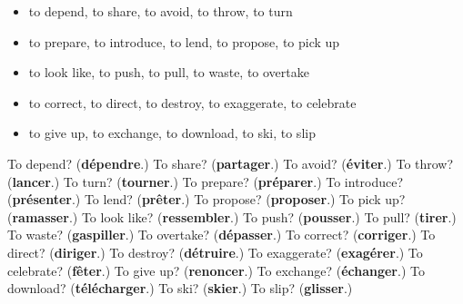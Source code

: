 \begin{itemize}
\raggedright
  \item to depend, to share, to avoid, to throw, to turn
  \item to prepare, to introduce, to lend, to propose, to pick up
  \item to look like, to push, to pull, to waste, to overtake
  \item to correct, to direct, to destroy, to exaggerate, to celebrate
  \item to give up, to exchange, to download, to ski, to slip
\end{itemize}

\begin{tcolorbox}[breakable,colback=teal!4,colframe=teal!35!black,title={Before you move on}]
To depend? (\textbf{dépendre}.) To share? (\textbf{partager}.) To avoid? (\textbf{éviter}.) To throw? (\textbf{lancer}.) To turn? (\textbf{tourner}.) To prepare? (\textbf{préparer}.) To introduce? (\textbf{présenter}.) To lend? (\textbf{prêter}.) To propose? (\textbf{proposer}.) To pick up? (\textbf{ramasser}.) To look like? (\textbf{ressembler}.) To push? (\textbf{pousser}.) To pull? (\textbf{tirer}.) To waste? (\textbf{gaspiller}.) To overtake? (\textbf{dépasser}.) To correct? (\textbf{corriger}.) To direct? (\textbf{diriger}.) To destroy? (\textbf{détruire}.) To exaggerate? (\textbf{exagérer}.) To celebrate? (\textbf{fêter}.) To give up? (\textbf{renoncer}.) To exchange? (\textbf{échanger}.) To download? (\textbf{télécharger}.) To ski? (\textbf{skier}.) To slip? (\textbf{glisser}.)
\end{tcolorbox}
